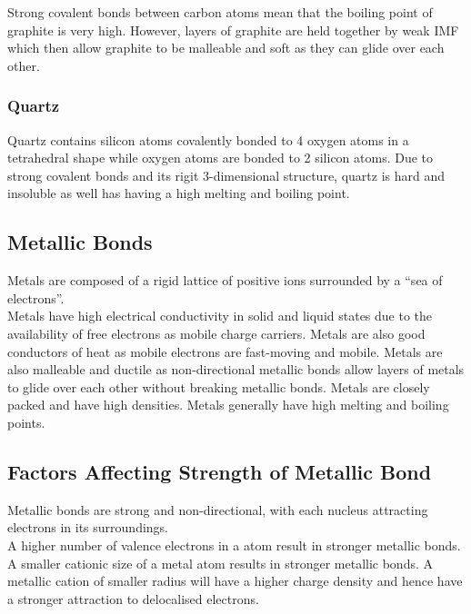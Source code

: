 \documentclass[../main]{subfiles}
\begin{document}
	Strong covalent bonds between carbon atoms mean that the boiling point of graphite is very high. However, layers of graphite are held together by weak IMF which then allow graphite to be malleable and soft as they can glide over each other.

	\subsubsection{Quartz}

	Quartz  contains silicon atoms covalently bonded to 4 oxygen atoms in a tetrahedral shape while oxygen atoms are bonded to 2 silicon atoms. Due to strong covalent bonds and its rigit 3-dimensional structure, quartz is hard and insoluble as well has having a high melting and boiling point.

	\subsection{Metallic Bonds}

	Metals are composed of a rigid lattice of positive ions surrounded by a ``sea of electrons''. \\

	Metals have high electrical conductivity in solid and liquid states due to the availability of free electrons as mobile charge carriers. Metals are also good conductors of heat as mobile electrons are fast-moving and mobile. Metals are also malleable and ductile as non-directional metallic bonds allow layers of metals to glide over each other without breaking metallic bonds. Metals are closely packed and have high densities. Metals generally have high melting and boiling points.

	\subsection{Factors Affecting Strength of Metallic Bond}

	Metallic bonds are strong and non-directional, with each nucleus attracting electrons in its surroundings. \\

	A higher number of valence electrons in a atom result in stronger metallic bonds.\\

	A smaller cationic size of a metal atom results in stronger metallic bonds. A metallic cation of smaller radius will have a higher charge density and hence have a stronger attraction to delocalised electrons.\\
\end{document}
